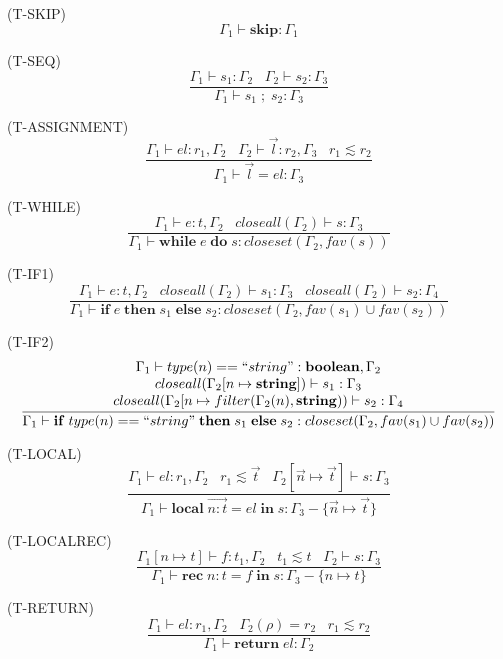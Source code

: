 \documentclass{paper}
\newcommand{\Boolean}{\mathbf{boolean}}
\newcommand{\String}{\mathbf{string}}
\newcommand{\mylabel}[1]{\; (\textsc{#1})}
\newcommand{\env}{\Gamma}
\newcommand{\ret}{\rho}
\begin{document}
\noindent

\mylabel{T-SKIP}
\[
\env_{1} \vdash \mathbf{skip}:\env_{1}
\]

\mylabel{T-SEQ}
\[
\dfrac{\env_{1} \vdash s_{1}:\env_{2} \;\;\;
       \env_{2} \vdash s_{2}:\env_{3}}
      {\env_{1} \vdash s_{1} \; ; \; s_{2}:\env_{3}}
\]

\mylabel{T-ASSIGNMENT}
\[
\dfrac{\env_{1} \vdash el:r_{1}, \env_{2} \;\;\;
       \env_{2} \vdash \vec{l}:r_{2}, \env_{3} \;\;\;
       r_{1} \lesssim r_{2}}
      {\env_{1} \vdash \vec{l} = el:\env_{3}}
\]

\mylabel{T-WHILE}
\[
\dfrac{\env_{1} \vdash e:t, \env_{2} \;\;\;
       closeall(\env_{2}) \vdash s:\env_{3}}
      {\env_{1} \vdash \mathbf{while} \; e \; \mathbf{do} \; s:closeset(\env_{2}, fav(s))}
\]

\mylabel{T-IF1}
\[
\dfrac{\env_{1} \vdash e:t, \env_{2} \;\;\;
       closeall(\env_{2}) \vdash s_{1}:\env_{3} \;\;\;
       closeall(\env_{2}) \vdash s_{2}:\env_{4}}
      {\env_{1} \vdash \mathbf{if} \; e \; \mathbf{then} \; s_{1} \; \mathbf{else} \; s_{2}:closeset(\env_{2}, fav(s_{1}) \cup fav(s_{2}))}
\]

\mylabel{T-IF2}
\[
\dfrac{\begin{array}{c}
       \env_{1} \vdash type(n) == ``string":\Boolean, \env_{2} \\
       closeall(\env_{2}[n \mapsto \String]) \vdash s_{1}:\env_{3} \\
       closeall(\env_{2}[n \mapsto filter(\env_{2}(n), \String)) \vdash s_{2}:\env_{4}
      \end{array}}
      {\env_{1} \vdash \mathbf{if} \; type(n) == ``string" \; \mathbf{then} \; s_{1} \; \mathbf{else} \; s_{2}:closeset(\env_{2}, fav(s_{1}) \cup fav(s_{2}))}
\]

\mylabel{T-LOCAL}
\[
\dfrac{\env_{1} \vdash el:r_{1}, \env_{2} \;\;\;
       r_{1} \lesssim \vec{t} \;\;\;
       \env_{2}[\vec{n} \mapsto \vec{t}] \vdash s:\env_{3}}
      {\env_{1} \vdash \mathbf{local} \; \vec{n{:}t} = el \; \mathbf{in} \; s:\env_{3} - \{\vec{n} \mapsto \vec{t}\}}
\]

\mylabel{T-LOCALREC}
\[
\dfrac{\env_{1}[n \mapsto t] \vdash f:t_{1}, \env_{2} \;\;\;
       t_{1} \lesssim t \;\;\;
       \env_{2} \vdash s:\env_{3}}
      {\env_{1} \vdash \mathbf{rec} \; n{:}t = f \; \mathbf{in} \; s:\env_{3} - \{n \mapsto t\}}
\]

\mylabel{T-RETURN}
\[
\dfrac{\env_{1} \vdash el:r_{1}, \env_{2} \;\;\;
       \env_{2}(\ret) = r_{2} \;\;\;
       r_{1} \lesssim r_{2}}
      {\env_{1} \vdash \mathbf{return} \; el:\env_{2}}
\]
\end{document}
